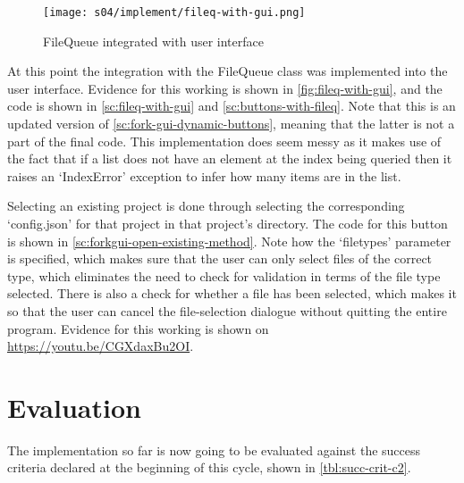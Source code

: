         \begin{figure}[!ht]
            \centering
            \texttt{[image: s04/implement/fileq-with-gui.png]}
            \caption{FileQueue integrated with user interface}
            \label{fig:fileq-with-gui}
        \end{figure}

        At this point the integration with the FileQueue class was implemented into the user interface. Evidence for this working is shown in \autoref{fig:fileq-with-gui}, and the code is shown in \autoref{sc:fileq-with-gui} and \autoref{sc:buttons-with-fileq}. 
        Note that this is an updated version of \autoref{sc:fork-gui-dynamic-buttons}, meaning that the latter is not a part of the final code. 
        This implementation does seem messy as it makes use of the fact that if a list does not have an element at the index being queried then it raises an `IndexError' exception to infer how many items are in the list.

        Selecting an existing project is done through selecting the corresponding `config.json' for that project in that project's directory. 
        The code for this button is shown in \autoref{sc:forkgui-open-existing-method}. 
        Note how the `filetypes' parameter is specified, which makes sure that the user can only select files of the correct type, which eliminates the need to check for validation in terms of the file type selected. 
        There is also a check for whether a file has been selected, which makes it so that the user can cancel the file-selection dialogue without quitting the entire program. 
        Evidence for this working is shown on \url{https://youtu.be/CGXdaxBu2OI}.
    

        


\section{Evaluation}
    The implementation so far is now going to be evaluated against the success criteria declared at the beginning of this cycle, shown in \autoref{tbl:succ-crit-c2}. 
    
